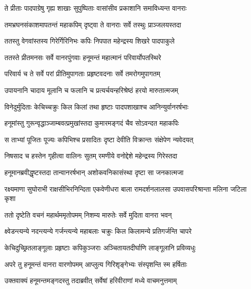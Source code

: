 \twolineshloka
{ते प्रीताः पादपाग्रेषु गृह्य शाखाः सुपुष्पिताः}
{वासांसीव प्रकाशानि समाविध्यन्त वानराः} %

\twolineshloka
{तमभ्रघनसंकाशमापतन्तं महाकपिम्}
{दृष्ट्वा ते वानराः सर्वे तस्थुः प्राञ्जलयस्तदा} %

\twolineshloka
{ततस्तु वेगवांस्तस्य गिरेर्गिरिनिभः कपिः}
{निपपात महेन्द्रस्य शिखरे पादपाकुले} %

\twolineshloka
{ततस्ते प्रीतमनसः सर्वे वानरपुंगवाः}
{हनूमन्तं महात्मानं परिवार्योपतस्थिरे} %

\twolineshloka
{परिवार्य च ते सर्वे परां प्रीतिमुपागताः}
{प्रहृष्टवदनाः सर्वे तमरोगमुपागतम्} %

\twolineshloka
{उपायनानि चादाय मूलानि च फलानि च}
{प्रत्यर्चयन्हरिश्रेष्ठं हरयो मारुतात्मजम्} %

\twolineshloka
{विनेदुर्मुदिताः केचिच्चक्रुः किल किलां तथा}
{हृष्टाः पादपशाखाश्च आनिन्युर्वानरर्षभाः} %

\twolineshloka
{हनूमांस्तु गुरून्वृद्धाञ्जाम्बवत्प्रमुखांस्तदा}
{कुमारमङ्गदं चैव सोऽवन्दत महाकपिः} %

\twolineshloka
{स ताभ्यां पूजितः पूज्यः कपिभिश्च प्रसादितः}
{दृष्टा देवीति विक्रान्तः संक्षेपेण न्यवेदयत्} %

\twolineshloka
{निषसाद च हस्तेन गृहीत्वा वालिनः सुतम्}
{रमणीये वनोद्देशे महेन्द्रस्य गिरेस्तदा} %

\twolineshloka
{हनूमानब्रवीद्धृष्टस्तदा तान्वानरर्षभान्}
{अशोकवनिकासंस्था दृष्टा सा जनकात्मजा} %

\threelineshloka
{रक्ष्यमाणा सुघोराभी राक्षसीभिरनिन्दिता}
{एकवेणीधरा बाला रामदर्शनलालसा}
{उपवासपरिश्रान्ता मलिना जटिला कृशा} %

\twolineshloka
{ततो दृष्टेति वचनं महार्थममृतोपमम्}
{निशम्य मारुतेः सर्वे मुदिता वानरा भवन्} %

\twolineshloka
{क्ष्वेडन्त्यन्ये नदन्त्यन्ये गर्जन्त्यन्ये महाबलाः}
{चक्रुः किल किलामन्ये प्रतिगर्जन्ति चापरे} %

\twolineshloka
{केचिदुच्छ्रितलाङ्गूलाः प्रहृष्टाः कपिकुञ्जराः}
{अञ्चितायतदीर्घाणि लाङ्गूलानि प्रविव्यधुः} %

\twolineshloka
{अपरे तु हनूमन्तं वानरा वारणोपमम्}
{आप्लुत्य गिरिशृङ्गेभ्यः संस्पृशन्ति स्म हर्षिताः} %

\twolineshloka
{उक्तवाक्यं हनूमन्तमङ्गदस्तु तदाब्रवीत्}
{सर्वेषां हरिवीराणां मध्ये वाचमनुत्तमाम्} %


